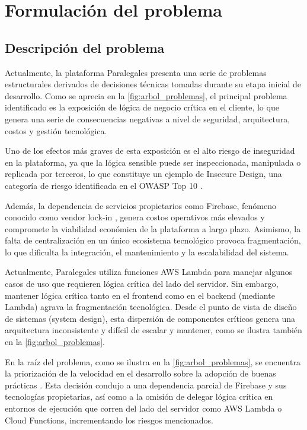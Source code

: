 \newpage
\section{Formulación del problema}

\subsection{Descripción del problema}
Actualmente, la plataforma Paralegales presenta una serie de problemas estructurales derivados de decisiones técnicas tomadas durante su etapa inicial de desarrollo. Como se aprecia en la \autoref{fig:arbol_problemas}, el principal problema identificado es la exposición de lógica de negocio crítica en el cliente, lo que genera una serie de consecuencias negativas a nivel de seguridad, arquitectura, costos y gestión tecnológica.

Uno de los efectos más graves de esta exposición es el alto riesgo de inseguridad en la plataforma, ya que la lógica sensible puede ser inspeccionada, manipulada o replicada por terceros, lo que constituye un ejemplo de Insecure Design, una categoría de riesgo identificada en el OWASP Top 10 \cite{OWASP2021}.

Además, la dependencia de servicios propietarios como Firebase, fenómeno conocido como vendor lock-in \cite{OparaMartins2014,OparaMartins2014,Harauzek2022}, genera costos operativos más elevados y compromete la viabilidad económica de la plataforma a largo plazo. Asimismo, la falta de centralización en un único ecosistema tecnológico provoca fragmentación, lo que dificulta la integración, el mantenimiento y la escalabilidad del sistema.

Actualmente, Paralegales utiliza funciones AWS Lambda para manejar algunos casos de uso que requieren lógica crítica del lado del servidor. Sin embargo, mantener lógica crítica tanto en el frontend como en el backend (mediante Lambda) agrava la fragmentación tecnológica. Desde el punto de vista de diseño de sistemas (system design), esta dispersión de componentes críticos genera una arquitectura inconsistente y difícil de escalar y mantener, como se ilustra también en la \autoref{fig:arbol_problemas}.

En la raíz del problema, como se ilustra en la \autoref{fig:arbol_problemas}, se encuentra la priorización de la velocidad en el desarrollo sobre la adopción de buenas prácticas \cite{BirrEngwall2024}. Esta decisión condujo a una dependencia parcial de Firebase y sus tecnologías propietarias, así como a la omisión de delegar lógica crítica en entornos de ejecución que corren del lado del servidor como AWS Lambda o Cloud Functions, incrementando los riesgos mencionados.

